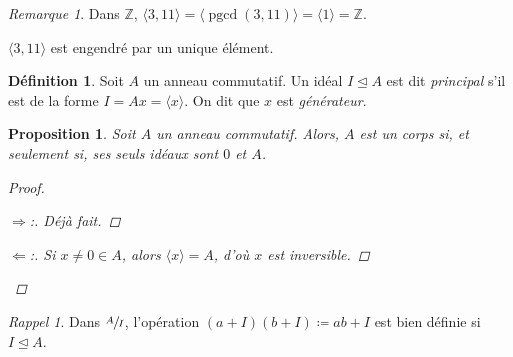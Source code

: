 \documentclass{report}
\newtheorem*{prop}{Proposition}
\theoremstyle{definition}
\newtheorem*{dfn}{D\'efinition}
\theoremstyle{remark}
\newtheorem*{rmq}{Remarque}
\newtheorem*{rapp}{Rappel}
\newenvironment*{subproof}[1][D\'emonstration]
{
\begin{proof}[#1]

}
{
\renewcommand{\qedsymbol}{$\blacksquare$}
\end{proof}
\renewcommand{\qedsymbol}{$\square$}
}
\def\ZZ{\mathbb{Z}}
\begin{document}
	\begin{rmq}
		Dans $\ZZ$, $\langle3,11\rangle = \langle\operatorname{pgcd}(3,11)\rangle = \langle1\rangle = \ZZ$.

		$\langle3,11\rangle$ est engendr\'e par un unique \'el\'ement.
	\end{rmq}

	\begin{dfn}
		Soit $A$ un anneau commutatif. Un id\'eal $I\trianglelefteq A$ est dit \emph{principal} s'il est de la forme $I=Ax=\langle x\rangle$. On dit que $x$ est \emph{g\'en\'erateur}.
	\end{dfn}

	\begin{prop}
		Soit $A$ un anneau commutatif. Alors, $A$ est un corps si, et seulement si, ses seuls id\'eaux sont $0$ et $A$.
		\begin{proof}
			\begin{subproof}[$\Rightarrow$:]
				D\'ej\`a fait.
			\end{subproof}
			\begin{subproof}[$\Leftarrow$:]
				Si $x\neq0\in A$, alors $\langle x\rangle=A$, d'o\`u $x$ est inversible.
			\end{subproof}
		\end{proof}
	\end{prop}

	\begin{rapp}
		Dans $\sfrac{A}{I}$, l'op\'eration $(a+I)(b+I) \coloneq ab+I$ est bien d\'efinie si $I\trianglelefteq A$.
	\end{rapp}
\end{document}
